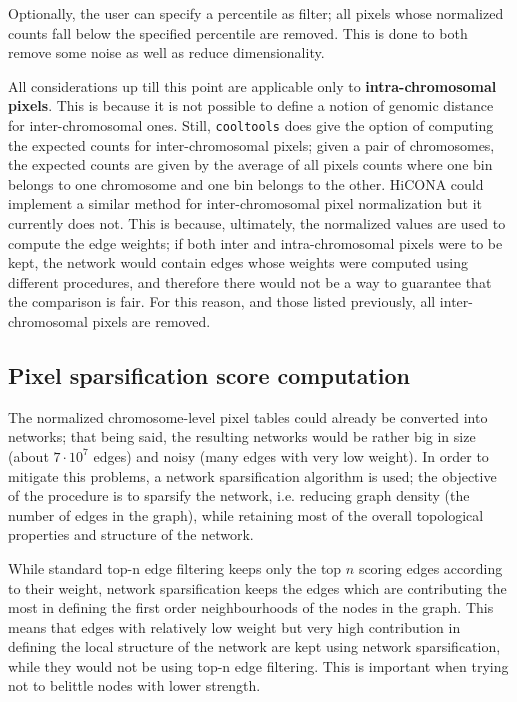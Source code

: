 Optionally, the user can specify a percentile as filter; all pixels whose normalized counts fall below the specified percentile are removed. This is done to both remove some noise as well as reduce dimensionality. 
 
All considerations up till this point are applicable only to \textbf{intra-chromosomal pixels}. This is because it is not possible to define a notion of genomic distance for inter-chromosomal ones. Still, \texttt{cooltools} does give the option of computing the expected counts for inter-chromosomal pixels; given a pair of chromosomes, the expected counts are given by the average of all pixels counts where one bin belongs to one chromosome and one bin belongs to the other. HiCONA could implement a similar method for inter-chromosomal pixel normalization but it currently does not. This is because, ultimately, the normalized values are used to compute the edge weights; if both inter and intra-chromosomal pixels were to be kept, the network would contain edges whose weights were computed using different procedures, and therefore there would not be a way to guarantee that the comparison is fair. For this reason, and those listed previously, all inter-chromosomal pixels are removed.

\subsection{Pixel sparsification score computation}\label{par:sparscore}

The normalized chromosome-level pixel tables could already be converted into networks; that being said, the resulting networks would be rather big in size (about $7 \cdot 10^7$ edges) and noisy (many edges with very low weight). In order to mitigate this problems, a network sparsification algorithm\cite{sparsification2009} is used; the objective of the procedure is to sparsify the network, i.e. reducing graph density (the number of edges in the graph), while retaining most of the overall topological properties and structure of the network.

While standard top-n edge filtering keeps only the top $n$ scoring edges according to their weight, network sparsification keeps the edges which are contributing the most in defining the first order neighbourhoods of the nodes in the graph. This means that edges with relatively low weight but very high contribution in defining the local structure of the network are kept using network sparsification, while they would not be using top-n edge filtering. This is important when trying not to belittle nodes with lower strength.

